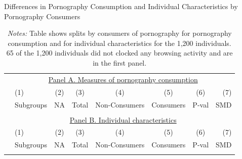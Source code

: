 \documentclass[12pt, letterpaper]{article}
\begin{document}
\begin{table}[ht] \centering \small \setlength\tabcolsep{5 pt}
	\caption{Differences in Pornography Consumption and Individual Characteristics by Pornography Consumers}
	\label{tab:characteristics_split_by_porn_consumers}
	\begin{adjustbox}{max width=\textwidth}
		\begin{tabular}{@{\hspace{0\tabcolsep}}llrcccrr@{\hspace{0\tabcolsep}}}
			\toprule
			&\multicolumn{7}{c}{\underline{Panel A. Measures of pornography consumption}}\\
			&\multicolumn{1}{l}{(1)}&\multicolumn{1}{c}{(2)}&\multicolumn{1}{c}{(3)}&\multicolumn{1}{c}{(4)}&\multicolumn{1}{c}{(5)}&\multicolumn{1}{c}{(6)}&\multicolumn{1}{r}{(7)}\\			
			&\multicolumn{1}{l}{Subgroups}&\multicolumn{1}{c}{NA}&\multicolumn{1}{c}{Total}&\multicolumn{1}{c}{Non-Consumers}&\multicolumn{1}{c}{Consumers}&\multicolumn{1}{c}{P-val}&\multicolumn{1}{r}{SMD}\\
			\cmidrule{2-8}
			\\
			\cmidrule{2-8}
			&\multicolumn{7}{c}{\underline{Panel B. Individual characteristics}}\\
			&\multicolumn{1}{l}{(1)}&\multicolumn{1}{c}{(2)}&\multicolumn{1}{c}{(3)}&\multicolumn{1}{c}{(4)}&\multicolumn{1}{c}{(5)}&\multicolumn{1}{c}{(6)}&\multicolumn{1}{r}{(7)}\\			
			&\multicolumn{1}{l}{Subgroups}&\multicolumn{1}{c}{NA}&\multicolumn{1}{c}{Total}&\multicolumn{1}{c}{Non-Consumers}&\multicolumn{1}{c}{Consumers}&\multicolumn{1}{c}{P-val}&\multicolumn{1}{r}{SMD}\\
			\cmidrule{2-8}
			\\
			\bottomrule
		\end{tabular}
	\end{adjustbox}
	\caption*{\scriptsize \emph{Notes:}
		Table shows splits by consumers of pornography for pornography consumption and for individual characteristics for the 1,200 individuals.
		65 of the 1,200 individuals did not clocked any browsing activity and are in the first panel.
}
\end{table}
\end{document}

